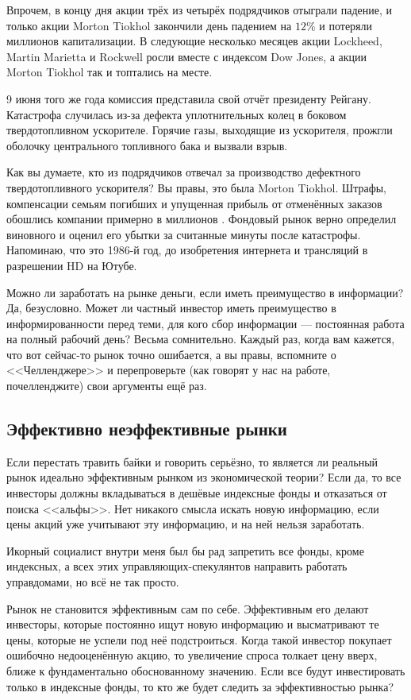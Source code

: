 Впрочем, в концу дня акции трёх из четырёх подрядчиков отыграли падение, и 
только акции Morton Tiokhol закончили день падением на $12\%$ и потеряли 
 миллионов капитализации. В следующие несколько месяцев акции 
Lockheed, Martin Marietta и Rockwell росли вместе с индексом Dow Jones, а акции 
Morton Tiokhol так и топтались на месте.

9 июня того же года комиссия представила свой отчёт президенту Рейгану. 
Катастрофа случилась из-за дефекта уплотнительных колец в боковом 
твердотопливном ускорителе. Горячие газы, выходящие из ускорителя, прожгли 
оболочку центрального топливного бака и вызвали взрыв.

Как вы думаете, кто из подрядчиков отвечал за производство дефектного 
твердотопливного ускорителя? Вы правы, это была Morton Tiokhol. Штрафы, 
компенсации семьям погибших и упущенная прибыль от отменённых заказов обошлись 
компании примерно в  миллионов \cite{maloney2003complexity}. 
Фондовый рынок верно определил виновного и оценил его убытки за считанные минуты 
после катастрофы. Напоминаю, что это 1986-й год, до изобретения интернета и 
трансляций в разрешении HD на Ютубе.

Можно ли заработать на рынке деньги, если иметь преимущество в информации? Да,
безусловно. Может ли частный инвестор иметь преимущество в информированности 
перед теми, для кого сбор информации --- постоянная работа на полный рабочий 
день? Весьма сомнительно. Каждый раз, когда вам кажется, что вот сейчас-то рынок
точно ошибается, а вы правы, вспомните о <<Челленджере>> и перепроверьте (как 
говорят у нас на работе, почелленджите) свои аргументы ещё раз.

\subsection{Эффективно неэффективные рынки}

Если перестать травить байки и говорить серьёзно, то является ли реальный рынок 
идеально эффективным рынком из экономической теории? Если да, то все инвесторы 
должны вкладываться в дешёвые индексные фонды и отказаться от поиска <<альфы>>. 
Нет никакого смысла искать новую информацию, если цены акций уже учитывают эту 
информацию, и на ней нельзя заработать. 

Икорный социалист внутри меня был бы рад запретить все фонды, кроме индексных, 
а всех этих управляющих-спекулянтов направить работать управдомами, но всё не 
так просто.

Рынок не становится эффективным сам по себе. Эффективным его делают 
инвесторы, которые постоянно ищут новую информацию и высматривают те цены, 
которые не успели под неё подстроиться. Когда такой инвестор покупает ошибочно 
недооценённую акцию, то увеличение спроса толкает цену вверх, ближе к 
фундаментально обоснованному значению. Если все будут инвестировать только в 
индексные фонды, то кто же будет следить за эффективностью рынка?

